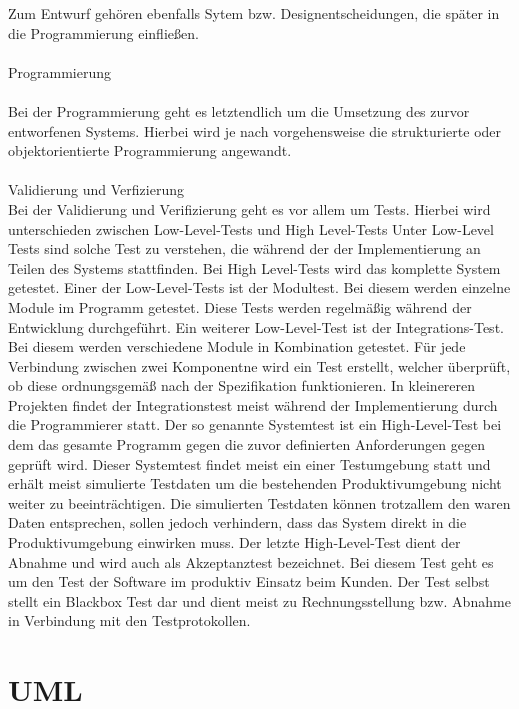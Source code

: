 Zum Entwurf gehören ebenfalls Sytem bzw. Designentscheidungen, die später in die Programmierung einfließen.
\\
\\
Programmierung\\
\\
Bei der Programmierung geht es letztendlich um die Umsetzung des zurvor entworfenen Systems. Hierbei wird je nach vorgehensweise die strukturierte oder objektorientierte Programmierung angewandt.
\\
\\
Validierung und Verfizierung
\\
Bei der Validierung  und Verifizierung geht es vor allem um Tests. Hierbei wird unterschieden zwischen Low-Level-Tests und High Level-Tests Unter Low-Level Tests sind solche Test zu verstehen, die während der der Implementierung an Teilen des Systems stattfinden. Bei High Level-Tests wird das komplette System getestet. Einer der Low-Level-Tests ist der Modultest. Bei diesem werden einzelne Module im Programm getestet.  Diese Tests werden regelmäßig während der Entwicklung durchgeführt. Ein weiterer Low-Level-Test ist der Integrations-Test. Bei diesem werden verschiedene Module in Kombination getestet. Für jede Verbindung zwischen zwei Komponentne wird ein Test erstellt, welcher überprüft, ob diese ordnungsgemäß nach der Spezifikation funktionieren. In kleinereren Projekten findet der Integrationstest meist während der Implementierung durch die Programmierer statt.
Der so genannte Systemtest ist ein High-Level-Test bei dem das gesamte Programm gegen die zuvor definierten Anforderungen gegen geprüft wird. Dieser Systemtest findet meist ein einer Testumgebung statt und erhält meist simulierte Testdaten um die bestehenden Produktivumgebung nicht weiter zu beeinträchtigen. Die simulierten Testdaten können trotzallem den waren Daten entsprechen, sollen jedoch verhindern, dass das System direkt in die Produktivumgebung einwirken muss.
Der letzte High-Level-Test dient der Abnahme und wird auch als Akzeptanztest bezeichnet. Bei diesem Test geht es um den Test der Software im produktiv Einsatz beim Kunden. Der Test selbst stellt ein Blackbox Test dar und dient meist zu Rechnungsstellung bzw. Abnahme in Verbindung mit den Testprotokollen.

\section{UML}
\label{sec:uml}

